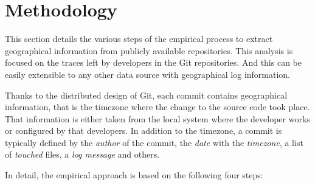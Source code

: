 \documentclass{sig-alternate-05-2015}
\begin{document}
\section{Methodology}
\label{sec:methodology}

This section details the various steps of the empirical process to extract 
geographical information from publicly available repositories. This analysis is 
focused on the traces left by developers in the Git repositories. And this can
be easily extensible to any other data source with geographical log information.


Thanks to the distributed design of Git, each commit contains geographical
information, that is the timezone where the change to the source code took place.
That information is either taken from the local system where the developer works or
configured by that developers.
In addition to the timezone, a commit is typically defined by the \emph{author} of the
commit, the \emph{date} with the \emph{timezone}, a list of \emph{touched} files,
a \emph{log message} and others. 



In detail, the empirical approach is based on the following four steps:
\end{document}
